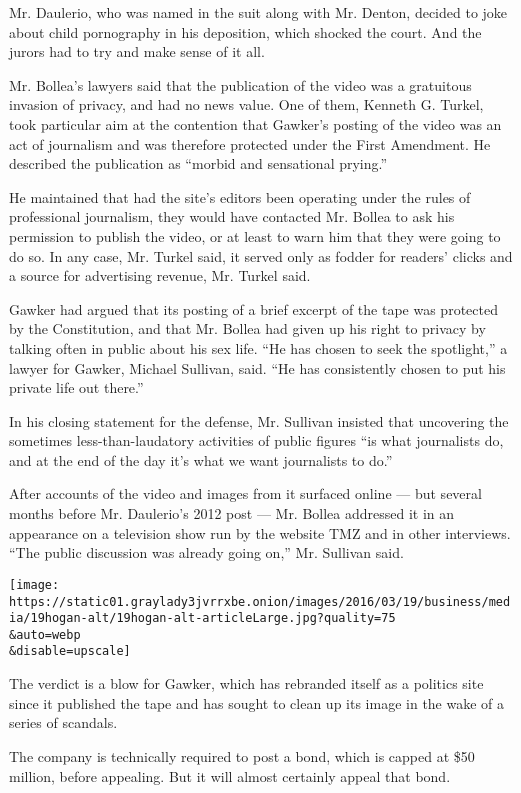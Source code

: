 Mr. Daulerio, who was named in the suit along with Mr. Denton, decided
to joke about child pornography in his deposition, which shocked the
court. And the jurors had to try and make sense of it all.

Mr. Bollea's lawyers said that the publication of the video was a
gratuitous invasion of privacy, and had no news value. One of them,
Kenneth G. Turkel, took particular aim at the contention that Gawker's
posting of the video was an act of journalism and was therefore
protected under the First Amendment. He described the publication as
``morbid and sensational prying.''

He maintained that had the site's editors been operating under the rules
of professional journalism, they would have contacted Mr. Bollea to ask
his permission to publish the video, or at least to warn him that they
were going to do so. In any case, Mr. Turkel said, it served only as
fodder for readers' clicks and a source for advertising revenue, Mr.
Turkel said.

Gawker had argued that its posting of a brief excerpt of the tape was
protected by the Constitution, and that Mr. Bollea had given up his
right to privacy by talking often in public about his sex life. ``He has
chosen to seek the spotlight,'' a lawyer for Gawker, Michael Sullivan,
said. ``He has consistently chosen to put his private life out there.''

In his closing statement for the defense, Mr. Sullivan insisted that
uncovering the sometimes less-than-laudatory activities of public
figures ``is what journalists do, and at the end of the day it's what we
want journalists to do.''

After accounts of the video and images from it surfaced online --- but
several months before Mr. Daulerio's 2012 post --- Mr. Bollea addressed
it in an appearance on a television show run by the website TMZ and in
other interviews. ``The public discussion was already going on,'' Mr.
Sullivan said.

\texttt{[image: https://static01.graylady3jvrrxbe.onion/images/2016/03/19/business/media/19hogan-alt/19hogan-alt-articleLarge.jpg?quality=75\\\&auto=webp\\\&disable=upscale]}

The verdict is a blow for Gawker, which has rebranded itself as a
politics site since it published the tape and has sought to clean up its
image in the wake of a series of scandals.

The company is technically required to post a bond, which is capped at
\$50 million, before appealing. But it will almost certainly appeal that
bond.

